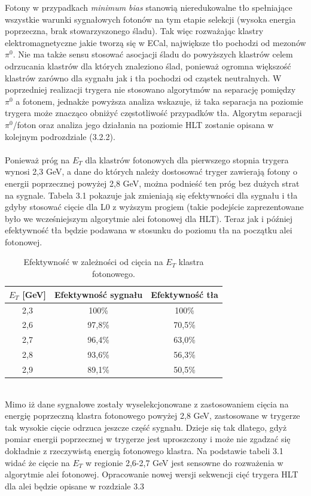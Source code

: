 \documentclass{pracamgr}
\begin{document}
\noindent
Fotony w przypadkach \textit{minimum bias} stanowią nieredukowalne tło spełniające wszystkie warunki sygnałowych fotonów na tym etapie selekcji (wysoka energia poprzeczna, brak stowarzyszonego śladu). Tak więc rozważając klastry elektromagnetyczne jakie tworzą się w ECal, największe tło pochodzi od mezonów $\pi^0$. Nie ma także sensu stosować asocjacji śladu do powyższych klastrów celem odrzucania klastrów dla których znaleziono ślad, ponieważ ogromna większość klastrów zarówno dla sygnału jak i tła pochodzi od cząstek neutralnych. W poprzedniej realizacji trygera nie stosowano algorytmów na separację pomiędzy $\pi^0$ a fotonem, jednakże powyższa analiza wskazuje, iż taka separacja na poziomie trygera może znacząco obniżyć częstotliwość przypadków tła. Algorytm separacji $\pi^0$/foton oraz analiza jego działania na poziomie HLT zostanie opisana w kolejnym podrozdziale (3.2.2).
\\\\
\noindent
Ponieważ próg na $E_T$ dla klastrów fotonowych dla pierwszego stopnia trygera wynosi 2,3 GeV, a dane do których należy dostosować tryger zawierają fotony o energii poprzecznej powyżej 2,8 GeV, można podnieść ten próg bez dużych strat na sygnale. Tabela 3.1 pokazuje jak zmieniają się efektywności dla sygnału i tła gdyby stosować cięcie dla L0 z wyższym progiem (takie podejście zaprezentowane było we wcześniejszym algorytmie alei fotonowej dla HLT). Teraz jak i później efektywność tła będzie podawana w stosunku do poziomu tła na początku alei fotonowej.
\begin{table}[!h]
 \centering
 \begin{tabular}{|c|c|c|}
  \hline
  $E_T$ [GeV] & Efektywność sygnału & Efektywność tła \\
  \hline 
  2,3 & 100\% & 100\% \\
  \hline
  2,6 & 97,8\% & 70,5\% \\
  \hline
  2,7 & 96,4\% & 63,0\% \\
  \hline
  2,8 & 93,6\% & 56,3\% \\
  \hline
  2,9 & 89,1\% & 50,5\% \\
  \hline
 \end{tabular}
 \caption{Efektywność w zależności od cięcia na $E_T$ klastra fotonowego.}
\end{table}
\\
\noindent
Mimo iż dane sygnałowe zostały wyselekcjonowane z zastosowaniem cięcia na energię poprzeczną klastra fotonowego powyżej 2,8 GeV, zastosowane w trygerze tak wysokie cięcie odrzuca jeszcze część sygnału. Dzieje się tak dlatego, gdyż pomiar energii poprzecznej w trygerze jest uproszczony i może nie zgadzać się dokładnie z rzeczywistą energią fotonowego klastra. Na podstawie tabeli 3.1 widać że cięcie na $E_T$ w regionie 2,6-2,7 GeV jest sensowne do rozważenia w algorytmie alei fotonowej. Opracowanie nowej wersji sekwencji cięć trygera HLT dla alei będzie opisane w rozdziale 3.3
\end{document}
